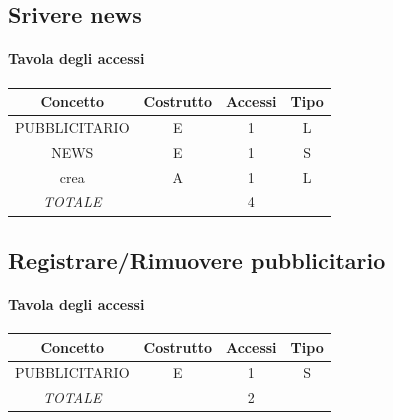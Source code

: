 \documentclass[a4paper,12pt]{report}
\begin{document}
\subsection{Srivere news}
\begin{table}[H]
    \paragraph{Tavola degli accessi\newline}
    \begin{tabular}{|c|c|c|c|}
    \hline
    Concetto          & Costrutto & Accessi & Tipo \\ \hline
    PUBBLICITARIO     & E         & 1       & L    \\ \hline
    NEWS              & E         & 1       & S    \\ \hline
    crea              & A         & 1       & L    \\ \hline
    \textit{TOTALE}   &           & 4       &      \\ \hline
    \end{tabular}
\end{table}

\subsection{Registrare/Rimuovere pubblicitario}
\begin{table}[H]
    \paragraph{Tavola degli accessi\newline}
    \begin{tabular}{|c|c|c|c|}
    \hline
    Concetto          & Costrutto & Accessi & Tipo \\ \hline
    PUBBLICITARIO     & E         & 1       & S    \\ \hline
    \textit{TOTALE}   &           & 2       &      \\ \hline
    \end{tabular}
\end{table}
\end{document}
